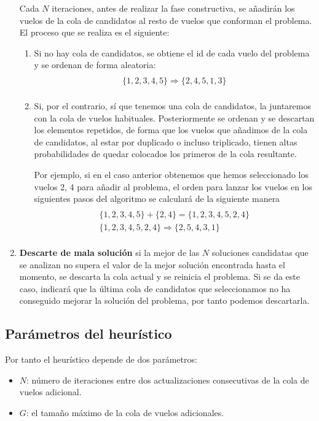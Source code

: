 \begin{enumerate}
		Cada $N$ iteraciones, antes de realizar la fase constructiva, se añadirán los vuelos de la cola de candidatos al resto de vuelos que conforman el problema. El proceso que se realiza es el siguiente:
	\begin{enumerate}
		\item Si no hay cola de candidatos, se obtiene el {\rm id} de cada vuelo del problema y se ordenan de forma aleatoria:
		\begin{multline}\\
		\{1,2,3,4,5\} \Rightarrow \{2,4,5,1,3\}\\
		\end{multline}
		\item Si, por el contrario, sí que tenemos una cola de candidatos, la juntaremos con la cola de vuelos habituales. Posteriormente se ordenan y se descartan los elementos repetidos, de forma que los vuelos que añadimos de la cola de candidatos, al estar por duplicado o incluso triplicado, tienen altas probabilidades de quedar colocados los primeros de la cola resultante.
		
		Por ejemplo, si en el caso anterior obtenemos que hemos seleccionado los vuelos 2, 4 para añadir al problema, el orden para lanzar los vuelos en los siguientes pasos del algoritmo se calculará de la siguiente manera
		\begin{multline}\\
		\{1,2,3,4,5\} + \{2,4\} = \{1,2,3,4,5,2,4\} \\
		\{1,2,3,4,5,2,4\} \Rightarrow \{2,5,4,3,1\}  \\ 
		\end{multline}
	\end{enumerate}
	
	\item \textbf{Descarte de mala solución} si la mejor de las $N$ soluciones candidatas que se analizan no supera el valor de la mejor solución encontrada hasta el momento, se descarta la cola actual y se reinicia el problema.
	Si se da este caso, indicará que la última cola de candidatos que seleccionamos no ha conseguido mejorar la solución del problema, por tanto podemos descartarla.
\end{enumerate}


\subsection{Parámetros del heurístico}
Por tanto el heurístico depende de dos parámetros:
\begin{itemize}
	\item \textbf{$N$}: número de iteraciones entre dos actualizaciones consecutivas de la cola de vuelos adicional.
	\item \textbf{$G$}: el tamaño máximo de la cola de vuelos adicionales.
\end{itemize}

